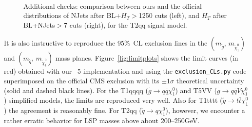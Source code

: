         \begin{figure}
        \centering
        \hspace{-1 cm}
        ~ %
        \caption{Additional checks: comparison between ours and the official distributions of NJets after BL+$H_T$$>$1250 cuts (left), and $H_T$ after BL+NJets$>$7 cuts (right), for the T2qq signal model.}
        \label{fig:last}
        \end{figure} 
        
        
\clearpage

It is also instructive to reproduce the 95\%~CL exclusion lines in the $(m_{\tilde g},\,m_{\tilde\chi^0_1})$ 
and $(m_{\tilde q},\,m_{\tilde\chi^0_1})$ mass planes.  
Figure~\ref{fig:limitplots}  shows the limit curves (in red) obtained with our 
{}~5 implementation and using the {\tt{exclusion\_CLs.py}} code
superimposed on the official CMS exclusion with its $\pm 1\sigma$ theoretical uncertainty (solid and dashed black lines).  For the T1qqqq ($\tilde{g}\to q\bar{q}\chi_{1}^{0}$) and T5VV ($\tilde{g} \to q\bar{q}V\chi_{1}^{0}$) simplified models, the limits are reproduced very well. 
Also for T1tttt ($\tilde{g}\to t\bar{t}\chi_{1}^{0}$) the agreement is reasonably fine. 
For T2qq ($\tilde{q}\to q \chi_{1}^{0} $), however, we encounter a rather erratic behavior for 
LSP masses above about 200--250GeV.

